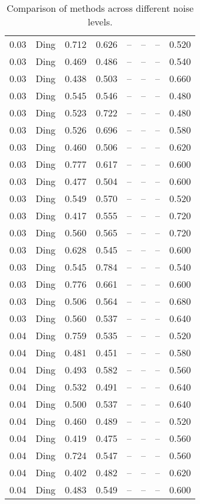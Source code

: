 \begin{table}[H]
\begin{tabular}{l c l l l}
0.03 & Ding & 0.712 & 0.626 & -- & -- & -- & 0.520 \\
0.03 & Ding & 0.469 & 0.486 & -- & -- & -- & 0.540 \\
0.03 & Ding & 0.438 & 0.503 & -- & -- & -- & 0.660 \\
0.03 & Ding & 0.545 & 0.546 & -- & -- & -- & 0.480 \\
0.03 & Ding & 0.523 & 0.722 & -- & -- & -- & 0.480 \\
0.03 & Ding & 0.526 & 0.696 & -- & -- & -- & 0.580 \\
0.03 & Ding & 0.460 & 0.506 & -- & -- & -- & 0.620 \\
0.03 & Ding & 0.777 & 0.617 & -- & -- & -- & 0.600 \\
0.03 & Ding & 0.477 & 0.504 & -- & -- & -- & 0.600 \\
0.03 & Ding & 0.549 & 0.570 & -- & -- & -- & 0.520 \\
0.03 & Ding & 0.417 & 0.555 & -- & -- & -- & 0.720 \\
0.03 & Ding & 0.560 & 0.565 & -- & -- & -- & 0.720 \\
0.03 & Ding & 0.628 & 0.545 & -- & -- & -- & 0.600 \\
0.03 & Ding & 0.545 & 0.784 & -- & -- & -- & 0.540 \\
0.03 & Ding & 0.776 & 0.661 & -- & -- & -- & 0.600 \\
0.03 & Ding & 0.506 & 0.564 & -- & -- & -- & 0.680 \\
0.03 & Ding & 0.560 & 0.537 & -- & -- & -- & 0.640 \\
0.04 & Ding & 0.759 & 0.535 & -- & -- & -- & 0.520 \\
0.04 & Ding & 0.481 & 0.451 & -- & -- & -- & 0.580 \\
0.04 & Ding & 0.493 & 0.582 & -- & -- & -- & 0.560 \\
0.04 & Ding & 0.532 & 0.491 & -- & -- & -- & 0.640 \\
0.04 & Ding & 0.500 & 0.537 & -- & -- & -- & 0.640 \\
0.04 & Ding & 0.460 & 0.489 & -- & -- & -- & 0.520 \\
0.04 & Ding & 0.419 & 0.475 & -- & -- & -- & 0.560 \\
0.04 & Ding & 0.724 & 0.547 & -- & -- & -- & 0.560 \\
0.04 & Ding & 0.402 & 0.482 & -- & -- & -- & 0.620 \\
0.04 & Ding & 0.483 & 0.549 & -- & -- & -- & 0.600 \\
\midrule
\bottomrule
\end{tabular}
\label{tab:SyntheticNoise}
\caption{Comparison of methods across different noise levels.}
\end{table}
